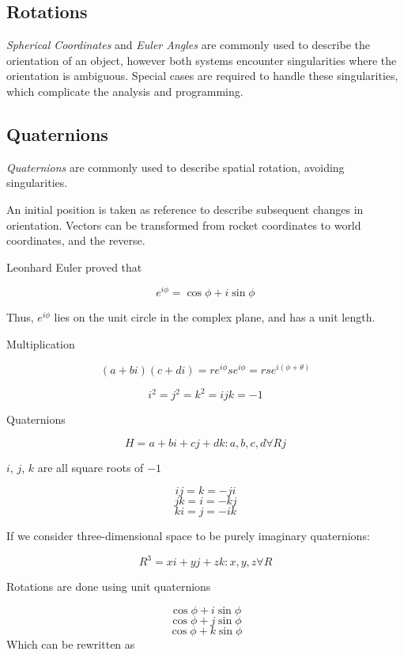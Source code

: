 \documentclass[]{book}
\begin{document}
\clearpage

\subsection{Rotations}\label{rotations}

\emph{Spherical Coordinates} and \emph{Euler Angles} are commonly used
to describe the orientation of an object, however both systems encounter
singularities where the orientation is ambiguous. Special cases are
required to handle these singularities, which complicate the analysis
and programming.

\subsection{Quaternions}\label{quaternions}

\emph{Quaternions} are commonly used to describe spatial rotation,
avoiding singularities.

An initial position is taken as reference to describe subsequent changes
in orientation. Vectors can be transformed from rocket coordinates to
world coordinates, and the reverse.

Leonhard Euler proved that

\begin{equation}
\label{eq_euler_mult}
e^{i\phi} = \cos \phi + i \sin \phi
\end{equation}

Thus, \(e^{i\phi}\) lies on the unit circle in the complex plane, and
has a unit length.

Multiplication

\[
(a+bi)(c+di) = re^{i\phi}se^{i\phi} = rse^{i(\phi + \theta)}
\]

\[
i^2 = j^2 = k^2 = ijk = -1
\]

Quaternions

\[
H = { a + bi + cj + dk : a,b,c,d \forall R }j
\]

\(i\), \(j\), \(k\) are all square roots of \(-1\)

\[
ij = k = -ji 
\] \[
jk = i = -kj 
\] \[
ki = j = -ik
\]

If we consider three-dimensional space to be purely imaginary
quaternions:

\[
R^3 = {xi + yj + zk : x,y,z \forall R}
\]

Rotations are done using unit quaternions

\[
\cos \phi + i \sin \phi 
\] \[
\cos \phi + j \sin \phi 
\] \[
\cos \phi + k \sin \phi
\] Which can be rewritten as
\end{document}
